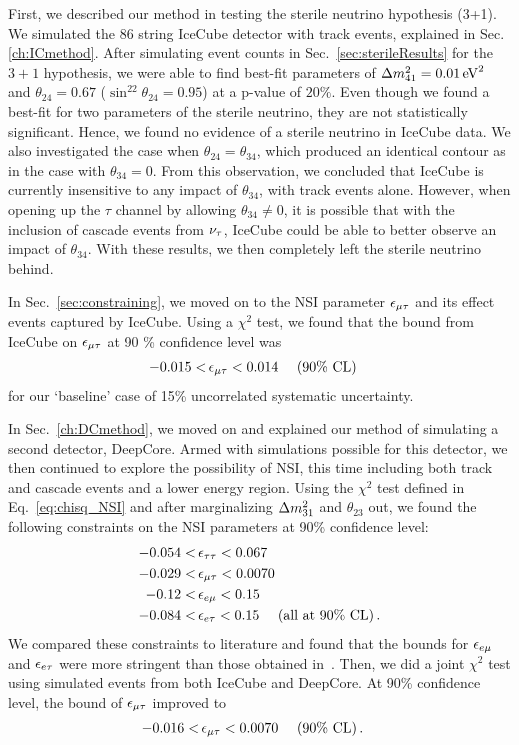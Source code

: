 First, we described our method in testing the sterile neutrino hypothesis (3+1). We simulated the 86 string IceCube detector with track events, explained in Sec.\ref{ch:ICmethod}.
After simulating event counts in Sec.~\ref{sec:sterileResults} for the $3+1$ hypothesis, we were able to find best-fit parameters of 
$\dm[41] = \SI{0.01}{\eV^2}$ and $\theta_{24} = 0.67$ ($\sin^22\theta_{24} = 0.95$) at 
a p-value of $20\%$. Even though we found a best-fit for two parameters of the sterile neutrino, they are not statistically significant. Hence, we found no evidence of a sterile neutrino in IceCube data.
We also investigated the case when $\theta_{24} = \theta_{34}$, which produced an identical contour as in the case with $\theta_{34}=0$. From this observation, 
we concluded that IceCube is currently insensitive to any impact of $\theta_{34}$, with track events alone. However,
when opening up the $\tau$ channel by allowing $\theta_{34} \neq 0$, it is possible that with the inclusion of cascade events from $\nu_\tau$, IceCube could be able to better observe 
an impact of $\theta_{34}$. With these results, we then completely left the sterile neutrino behind.

In Sec.~\ref{sec:constraining}, we moved on to the NSI parameter $\epsilon_{\mu\tau}$ and its effect events captured by IceCube. 
Using a $\chi^2$ test, we found that the bound from IceCube on $\epsilon_{\mu\tau}$ at 90 \% confidence level was 
\begin{align}
    -0.015 <\,& \epsilon_{\mu\tau} < 0.014\ \quad (90\% \text{ CL})
\end{align}
for our `baseline' case of 15\% uncorrelated systematic uncertainty.

In Sec.~\ref{ch:DCmethod}, we moved on and explained our method of simulating a second detector, DeepCore. Armed with simulations possible for this detector, we then continued to explore the possibility of NSI, this time including both track and cascade events and a lower energy region.
Using the $\chi^2$ test defined in Eq.~\ref{eq:chisq_NSI} and after marginalizing $\dm[31]$ and $\theta_{23}$ out, we found the following constraints on the NSI parameters at 90\% confidence level:
\begin{align}
    -0.054 <&\, \epsilon_{\tau\tau} < 0.067 \nonumber \\
    -0.029 <&\, \epsilon_{\mu\tau} < 0.0070 \nonumber \\
    -0.12 <&\, \epsilon_{e\mu} < 0.15 \nonumber \\
    -0.084 <&\, \epsilon_{e\tau} < 0.15\ \quad (\text{all at }90\% \text{ CL})\,.
 \end{align}
We compared these constraints to literature and found that the bounds for $\epsilon_{e\mu}$ and $\epsilon_{e\tau}$ were more stringent than those obtained in~\cite{demidov}.
Then, we did a joint $\chi^2$ test using simulated events from both IceCube and DeepCore. At 90\% confidence level, the bound of $\epsilon_{\mu\tau}$ improved to
\begin{align}
    -0.016 <&\, \epsilon_{\mu\tau} < 0.0070\ \quad (90\% \text{ CL})\,.
 \end{align}

